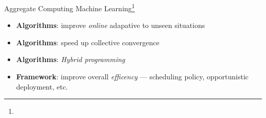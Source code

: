 \begin{frame}{Aggregate Computing \faPlus[left] Machine Learning\footnote[frame]{}}
  \begin{card}[Why?]
    \begin{itemize} 
      \item \textbf{Algorithms}: improve \textit{online} adapative to unseen situations
      \item \textbf{Algorithms}: speed up collective convergence
      \item \textbf{Algorithms}: \textit{Hybrid programming}
      \item \textbf{Framework}: improve overall \textit{efficency} --- scheduling policy, opportunistic deployment, etc.
    \end{itemize}
  \end{card}
\end{frame}